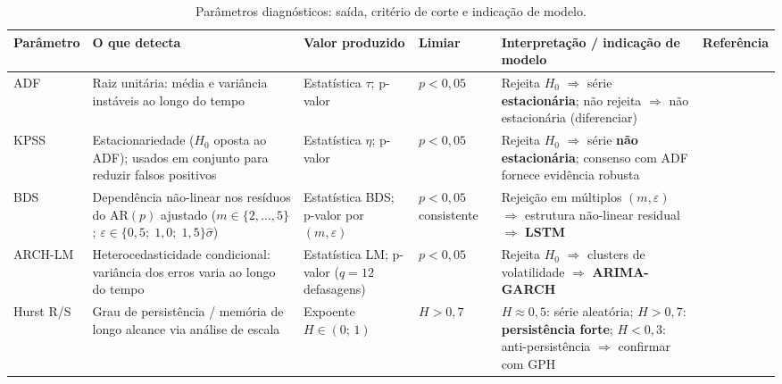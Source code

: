 \documentclass[12pt, a4paper]{article}
\begin{document}
\begin{table}[ht]
  \centering
  \caption{Parâmetros diagnósticos: saída, critério de corte e indicação de modelo.}
  \label{tab:parametros}
  \footnotesize
  \setlength{\tabcolsep}{5pt}
  \begin{tabular}{p{1.5cm}p{3.9cm}p{2.3cm}p{1.7cm}p{3.5cm}p{2.1cm}}
    \toprule
    \textbf{Parâmetro} &
    \textbf{O que detecta} &
    \textbf{Valor produzido} &
    \textbf{Limiar} &
    \textbf{Interpretação / indicação de modelo} &
    \textbf{Referência} \\
    \midrule

    ADF &
    Raiz unitária: média e variância instáveis ao longo do tempo &
    Estatística $\tau$; p-valor &
    $p < 0{,}05$ &
    Rejeita $H_0$ $\Rightarrow$ série \textbf{estacionária};
    não rejeita $\Rightarrow$ não estacionária (diferenciar) &
    \cite{said1984testing} \\[5pt]

    KPSS &
    Estacionariedade ($H_0$ oposta ao ADF); usados em conjunto para reduzir falsos positivos &
    Estatística $\eta$; p-valor &
    $p < 0{,}05$ &
    Rejeita $H_0$ $\Rightarrow$ série \textbf{não estacionária};
    consenso com ADF fornece evidência robusta &
    \cite{kwiatkowski1992testing} \\[5pt]

    BDS &
    Dependência não-linear nos resíduos do AR$(p)$ ajustado
    ($m \in \{2,\ldots,5\}$; $\varepsilon \in \{0{,}5;\;1{,}0;\;1{,}5\}\hat{\sigma}$) &
    Estatística BDS; p-valor por $(m,\varepsilon)$ &
    $p < 0{,}05$ consistente &
    Rejeição em múltiplos $(m,\varepsilon)$ $\Rightarrow$
    estrutura não-linear residual $\Rightarrow$ \textbf{LSTM} &
    \cite{broock1996test} \\[5pt]

    ARCH-LM &
    Heterocedasticidade condicional: variância dos erros varia ao longo do tempo &
    Estatística LM; p-valor ($q = 12$ defasagens) &
    $p < 0{,}05$ &
    Rejeita $H_0$ $\Rightarrow$ clusters de volatilidade $\Rightarrow$ \textbf{ARIMA-GARCH} &
    \cite{engle1982autoregressive} \\[5pt]

    Hurst R/S &
    Grau de persistência / memória de longo alcance via análise de escala &
    Expoente $H \in (0;\,1)$ &
    $H > 0{,}7$ &
    $H \approx 0{,}5$: série aleatória; $H > 0{,}7$: \textbf{persistência forte};
    $H < 0{,}3$: anti-persistência $\Rightarrow$ confirmar com GPH &
    \cite{hurst1951long-storage} \\[5pt]


\end{tabular}
\end{table}
\end{document}
